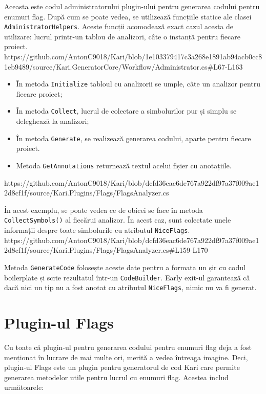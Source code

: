 \documentclass[a4paper,12pt]{report}
\begin{document}
Aceasta este codul administratorului plugin-ului pentru generarea codului pentru enumuri flag.
După cum se poate vedea, se utilizează funcțiile statice ale clasei \texttt{AdministratorHelpers}.
Aceste funcții acomodează exact cazul acesta de utilizare: lucrul printr-un tablou de analizori, câte o instanță pentru fiecare proiect.
https://github.com/AntonC9018/Kari/blob/1e103379417c3a268e1891ab94acb0cc81eb9489/source/Kari.GeneratorCore/Workflow/Administrator.cs#L67-L163 

\begin{itemize}
  \item În metoda \texttt{Initialize\(\)} tabloul cu analizorii se umple, câte un analizor pentru fiecare proiect;
  \item În metoda \texttt{Collect\(\)}, lucrul de colectare a simbolurilor pur și simplu se deleghează la analizori;
  \item În metoda \texttt{Generate\(\)}, se realizează generarea codului, aparte pentru fiecare proiect.
  \item Metoda \texttt{GetAnnotations\(\)} returnează textul acelui fișier cu anotațiile.
\end{itemize}

https://github.com/AntonC9018/Kari/blob/dcfd36eac6de767a922df97a37f009ae12d8cf1f/source/Kari.Plugins/Flags/FlagsAnalyzer.cs

În acest exemplu, se poate vedea ce de obicei se face în metoda \texttt{CollectSymbols()} al fiecărui analizor.
În acest caz, sunt colectate unele informații despre toate simbolurile cu atributul \texttt{NiceFlags}.
https://github.com/AntonC9018/Kari/blob/dcfd36eac6de767a922df97a37f009ae12d8cf1f/source/Kari.Plugins/Flags/FlagsAnalyzer.cs#L159-L170

Metoda \texttt{GenerateCode\(\)} folosește aceste date pentru a formata un șir cu codul boilerplate și scrie rezultatul într-un \texttt{CodeBuilder}.
Early exit-ul garantează că dacă nici un tip nu a fost anotat cu atributul \texttt{NiceFlags}, nimic nu va fi generat.


\section{Plugin-ul Flags}

Cu toate că plugin-ul pentru generarea codului pentru enumuri flag deja a fost menționat în lucrare de mai multe ori, merită a vedea întreaga imagine.
Deci, plugin-ul Flags este un plugin pentru generatorul de cod Kari care permite generarea metodelor utile pentru lucrul cu enumuri flag.
Acestea includ următoarele:
\end{document}
